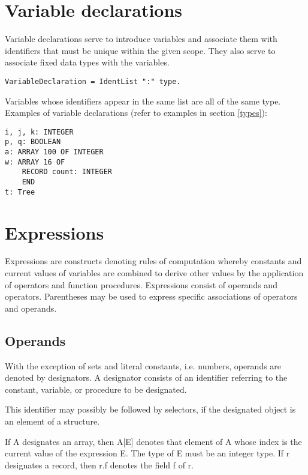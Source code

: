 \documentclass[12pt]{article}
\begin{document}
\section{Variable declarations}

Variable declarations serve to introduce variables and associate them with identifiers that must be unique within the given scope. They also serve to associate fixed data types with the variables.

\begin{lstlisting}[style=ebnf]
VariableDeclaration = IdentList ":" type.
\end{lstlisting}

Variables whose identifiers appear in the same list are all of the same type. Examples of variable declarations (refer to examples in section \ref{types}):

\begin{lstlisting}[style=example]
i, j, k: INTEGER
p, q: BOOLEAN
a: ARRAY 100 OF INTEGER
w: ARRAY 16 OF
    RECORD count: INTEGER
    END
t: Tree
\end{lstlisting}

\section{Expressions}

Expressions are constructs denoting rules of computation whereby constants and current values of variables are combined to derive other values by the application of operators and function procedures. Expressions consist of operands and operators. Parentheses may be used to express specific associations of operators and operands.

\subsection{Operands}
\label{operands}

With the exception of sets and literal constants, i.e. numbers, operands are denoted by designators. A designator consists of an identifier referring to the constant, variable, or procedure to be designated. 

This identifier may possibly be followed by selectors, if the designated object is an element of a structure.

If A designates an array, then A[E] denotes that element of A whose index is the current value of the expression E. The type of E must be an integer type.
If r designates a record, then r.f denotes the field f of r.
\end{document}
